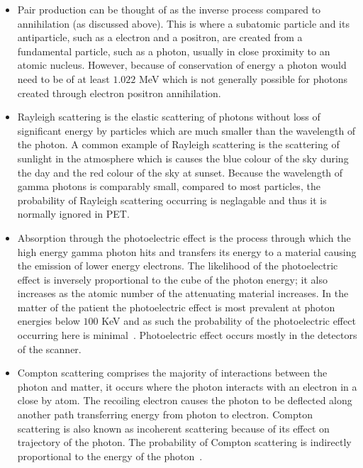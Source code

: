                 \begin{itemize}
                    \item Pair production can be thought of as the inverse process compared to annihilation (as discussed above). This is where a subatomic particle and its antiparticle, such as a electron and a positron, are created from a fundamental particle, such as a photon, usually in close proximity to an atomic nucleus. However, because of conservation of energy a photon would need to be of at least $1.022$ \gls{MeV} which is not generally possible for photons created through electron positron annihilation.
                    
                    \item Rayleigh scattering is the elastic scattering of photons without loss of significant energy by particles which are much smaller than the wavelength of the photon. A common example of Rayleigh scattering is the scattering of sunlight in the atmosphere which is causes the blue colour of the sky during the day and the red colour of the sky at sunset. Because the wavelength of gamma photons is comparably small, compared to most particles, the probability of Rayleigh scattering occurring is neglagable and thus it is normally ignored in \gls{PET}.
                    
                    \item Absorption through the photoelectric effect is the process through which the high energy gamma photon hits and transfers its energy to a material causing the emission of lower energy electrons. The likelihood of the photoelectric effect is inversely proportional to the cube of the photon energy; it also increases as the atomic number of the attenuating material increases. In the matter of the patient the photoelectric effect is most prevalent at photon energies below $100$ \gls{KeV} and as such the probability of the photoelectric effect occurring here is minimal~. Photoelectric effect occurs mostly in the detectors of the scanner.
                    
                    \item Compton scattering comprises the majority of interactions between the photon and matter, it occurs where the photon interacts with an electron in a close by atom. The recoiling electron causes the photon to be deflected along another path transferring energy from photon to electron. Compton scattering is also known as incoherent scattering because of its effect on trajectory of the photon. The probability of Compton scattering is indirectly proportional to the energy of the photon~.
                \end{itemize}
                
